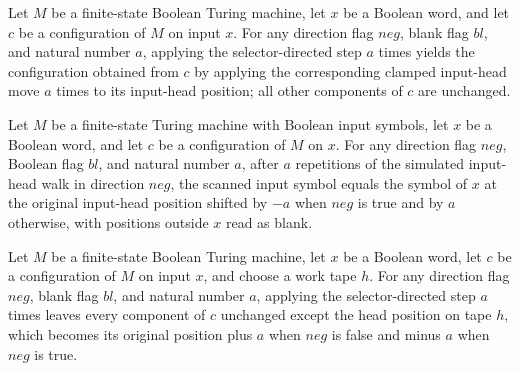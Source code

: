 \begin{theorem}
\label{Complexity.Meyer.wstep_none_iterate}
\leanok
{}
Let $M$ be a finite-state Boolean Turing machine, let $x$ be a Boolean word, and let $c$
be a configuration of $M$ on input $x$. For any direction flag $neg$, blank flag $bl$,
and natural number $a$, applying the selector-directed step $a$ times yields the
configuration obtained from $c$ by applying the corresponding clamped input-head move
$a$ times to its input-head position; all other components of $c$ are unchanged.
\end{theorem}

\begin{theorem}
\label{Complexity.Meyer.walked_input}
\leanok
{}
Let $M$ be a finite-state Turing machine with Boolean input symbols, let $x$ be a
Boolean word, and let $c$ be a configuration of $M$ on $x$. For any direction flag
$neg$, Boolean flag $bl$, and natural number $a$, after $a$ repetitions of the simulated
input-head walk in direction $neg$, the scanned input symbol equals the symbol of $x$ at
the original input-head position shifted by $-a$ when $neg$ is true and by $a$
otherwise, with positions outside $x$ read as blank.
\end{theorem}

\begin{theorem}
\label{Complexity.Meyer.wstep_some_iterate}
\leanok
{}
Let $M$ be a finite-state Boolean Turing machine, let $x$ be a Boolean word, let $c$ be
a configuration of $M$ on input $x$, and choose a work tape $h$. For any direction flag
$neg$, blank flag $bl$, and natural number $a$, applying the selector-directed step $a$
times leaves every component of $c$ unchanged except the head position on tape $h$,
which becomes its original position plus $a$ when $neg$ is false and minus $a$ when
$neg$ is true.
\end{theorem}

